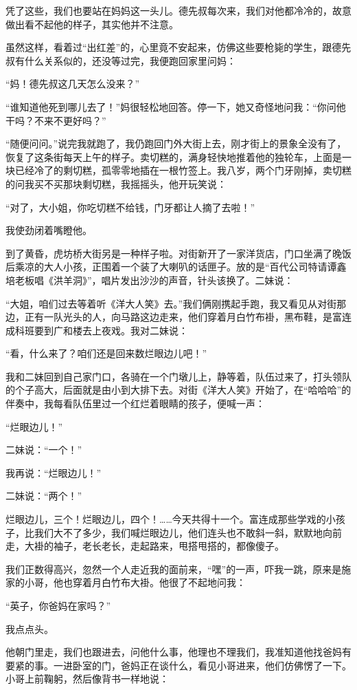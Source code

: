 \par 凭了这些，我们也要站在妈妈这一头儿。德先叔每次来，我们对他都冷冷的，故意做出看不起他的样子，其实他并不注意。
\par 虽然这样，看着过“出红差”的，心里竟不安起来，仿佛这些要枪毙的学生，跟德先叔有什么关系似的，还没等过完，我便跑回家里问妈：
\par “妈！德先叔这几天怎么没来？”
\par “谁知道他死到哪儿去了！”妈很轻松地回答。停一下，她又奇怪地问我：“你问他干吗？不来不更好吗？”
\par “随便问问。”说完我就跑了，我仍跑回门外大街上去，刚才街上的景象全没有了，恢复了这条街每天上午的样子。卖切糕的，满身轻快地推着他的独轮车，上面是一块已经冷了的剩切糕，孤零零地插在一根竹签上。我八岁，两个门牙刚掉，卖切糕的问我买不买那块剩切糕，我摇摇头，他开玩笑说：
\par “对了，大小姐，你吃切糕不给钱，门牙都让人摘了去啦！”
\par 我使劲闭着嘴瞪他。
\par 到了黄昏，虎坊桥大街另是一种样子啦。对街新开了一家洋货店，门口坐满了晚饭后乘凉的大人小孩，正围着一个装了大喇叭的话匣子。放的是“百代公司特请谭鑫培老板唱《洪羊洞》”，唱片发出沙沙的声音，针头该换了。二妹说：
\par “大姐，咱们过去等着听《洋大人笑》去。”我们俩刚携起手跑，我又看见从对街那边，正有一队光头的人，向马路这边走来，他们穿着月白竹布褂，黑布鞋，是富连成科班要到广和楼去上夜戏。我对二妹说：
\par “看，什么来了？咱们还是回来数烂眼边儿吧！”
\par 我和二妹回到自己家门口，各骑在一个门墩儿上，静等着，队伍过来了，打头领队的个子高大，后面就是由小到大排下去。对街《洋大人笑》开始了，在“哈哈哈”的伴奏中，我每看队伍里过一个红烂着眼睛的孩子，便喊一声：
\par “烂眼边儿！”
\par 二妹说：“一个！”
\par 我再说：“烂眼边儿！”
\par 二妹说：“两个！”
\par 烂眼边儿，三个！烂眼边儿，四个！……今天共得十一个。富连成那些学戏的小孩子，比我们大不了多少，我们喊烂眼边儿，他们连头也不敢斜一斜，默默地向前走，大褂的袖子，老长老长，走起路来，甩搭甩搭的，都像傻子。
\par 我们正数得高兴，忽然一个人走近我的面前来，“嘿”的一声，吓我一跳，原来是施家的小哥，他也穿着月白竹布大褂。他很了不起地问我：
\par “英子，你爸妈在家吗？”
\par 我点点头。
\par 他朝门里走，我们也跟进去，问他什么事，他理也不理我们，我准知道他找爸妈有要紧的事。一进卧室的门，爸妈正在谈什么，看见小哥进来，他们仿佛愣了一下。小哥上前鞠躬，然后像背书一样地说：
